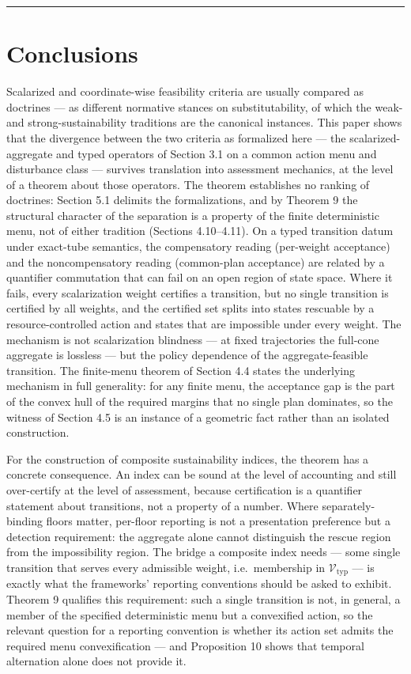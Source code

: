 \documentclass[3p,11pt]{elsarticle}
\begin{document}
\begin{center}\rule{0.5\linewidth}{0.5pt}\end{center}

\section{Conclusions}\label{conclusions}

Scalarized and coordinate-wise feasibility criteria are usually compared
as doctrines --- as different normative stances on substitutability, of
which the weak- and strong-sustainability traditions are the canonical
instances. This paper shows that the divergence between the two criteria
as formalized here --- the scalarized-aggregate and typed
operators of Section 3.1 on a common action menu and disturbance class
--- survives translation into assessment mechanics, at the level of a
theorem about those operators. The theorem establishes no ranking of doctrines: Section 5.1 delimits the formalizations, and by Theorem 9 the structural character of the separation is a property of the finite deterministic menu, not of either tradition (Sections 4.10--4.11). On a typed transition datum under exact-tube semantics, the
compensatory reading (per-weight acceptance) and the noncompensatory
reading (common-plan acceptance) are related by a quantifier commutation
that can fail on an open region of state space. Where it fails, every
scalarization weight certifies a transition, but no single transition is
certified by all weights, and the certified set splits into states
rescuable by a resource-controlled action and states that are impossible
under every weight. The mechanism is not scalarization blindness --- at
fixed trajectories the full-cone aggregate is lossless --- but the
policy dependence of the aggregate-feasible transition. The
finite-menu theorem of Section 4.4 states the underlying mechanism in
full generality: for any finite menu, the acceptance gap is the part of
the convex hull of the required margins that no single plan dominates,
so the witness of Section 4.5 is an instance of a geometric fact rather
than an isolated construction.

For the construction of composite sustainability indices, the theorem
has a concrete consequence. An index can be sound at the level of
accounting and still over-certify at the level of assessment, because
certification is a quantifier statement about transitions, not a
property of a number. Where separately-binding floors matter, per-floor
reporting is not a presentation preference but a detection requirement:
the aggregate alone cannot distinguish the rescue region from the
impossibility region. The bridge a composite index needs --- some single
transition that serves every admissible weight, i.e.~membership in
\(\mathcal{V}_{\mathrm{typ}}\) --- is exactly what the frameworks'
reporting conventions should be asked to exhibit. Theorem 9 qualifies this requirement: such a single transition is not, in general, a member of the specified deterministic menu but a convexified action, so the relevant question for a reporting convention is whether its action set admits the required menu convexification --- and Proposition 10 shows that temporal alternation alone does not provide it.
\end{document}
